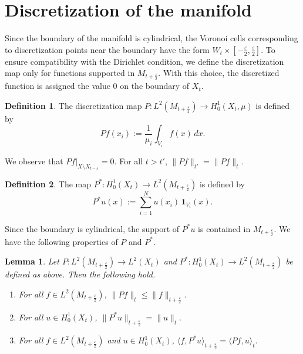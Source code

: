 \documentclass[10 pt, reqno]{amsart}
\newtheorem{lemma}[theorem]{Lemma}
\theoremstyle{definition}
\newtheorem{definition}{Definition}
\numberwithin{equation}{section}
\begin{document}
\section{Discretization of the manifold}
Since the boundary of the manifold is cylindrical, the Voronoi cells corresponding to discretization points near the boundary have the form $W_t \times \left[-\frac{\varepsilon}{2},\frac{\varepsilon}{2}\right]$. 
To ensure compatibility with the Dirichlet condition, we define the discretization map only for functions supported in $M_{t+\frac{\varepsilon}{2}}$. With this choice, the discretized function is assigned the value $0$ on the boundary of $X_t$.
\begin{definition}\label{def:disc-map-Mrho}
The discretization map $P \colon L^2(M_{t+\frac{\varepsilon}{2}}) \to H^1_0(X_t,\mu)$ is defined by
\[
P f(x_i)
:=
\frac{1}{\mu_i}\int_{V_i} f(x)\,dx.
\]

\end{definition}
We observe that $Pf|_{X\setminus X_{t-\varepsilon}}=0.$ For all $t>t'$, $\|Pf\|_{t'}=\|Pf\|_t.$
\begin{definition}\label{def:Pstar-Mrho}
The map $P^* \colon H^1_0(X_t) \to L^2(M_{t+\frac{\varepsilon}{2}})$ is defined by
\[
P^*u(x)
:=
\sum_{i=1}^N u(x_i)\,\mathbf 1_{V_i}(x).
\]

\end{definition}
Since the boundary is cylindrical, the support of $P^*u$ is contained in $M_{t+\frac{\varepsilon}{2}}.$ We have the following properties of $P$ and $P^*$.
\begin{lemma}\label{lem:P-properties-Mrho}
Let $P:L^2(M_{t+\frac{\varepsilon}{2}})\to L^2(X_t)$ and $P^*:H^1_0(X_t)\to L^2(M_{t+\frac{\varepsilon}{2}})$ be defined as above. Then the following hold.

\begin{enumerate}
\item For all $f\in L^2(M_{t+\frac{\varepsilon}{2}})$, $\|Pf\|_{t} \le \|f\|_{t+\frac{\varepsilon}{2}}.$

\item For all $u\in H^1_0(X_t)$, $\|P^*u\|_{t+\frac{\varepsilon}{2}} = \|u\|_{t}.$

\item For all $f\in L^2(M_{t+\frac{\varepsilon}{2}})$ and $ u\in H^1_0(X_t)$,   $\langle f,P^*u\rangle_{t+\frac{\varepsilon}{2}}
=
\langle Pf,u\rangle_{t}
 .$
\end{enumerate}
\end{lemma}
\end{document}
